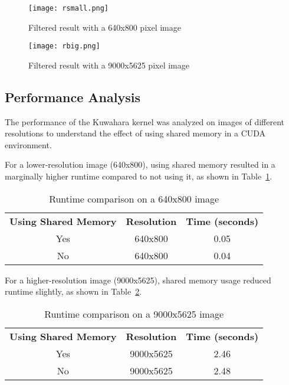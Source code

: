 \documentclass{article}
\begin{document}
    \begin{figure}
        \centering
        \texttt{[image: rsmall.png]}
        \caption{Filtered result with a 640x800 pixel image}
        \label{fig:sample_result_small}
    \end{figure}

    \begin{figure}
        \centering
        \texttt{[image: rbig.png]}
        \caption{Filtered result with a 9000x5625 pixel image}
        \label{fig:sample_result_big}
    \end{figure}

    \subsection{Performance Analysis}
    The performance of the Kuwahara kernel was analyzed on images of different resolutions to understand the effect of using shared memory in a CUDA environment.

    For a lower-resolution image (640x800), using shared memory resulted in a marginally higher runtime compared to not using it, as shown in Table~\ref{tab:result_shared_memory_small}.

    \begin{table}[H]
        \centering
        \begin{tabular}{ccc}
           \textbf{Using Shared Memory} & \textbf{Resolution} & \textbf{Time (seconds)} \\
           Yes & 640x800 & 0.05 \\
           No  & 640x800 & 0.04 \\
        \end{tabular}
        \caption{Runtime comparison on a 640x800 image}
        \label{tab:result_shared_memory_small}
    \end{table}

    For a higher-resolution image (9000x5625), shared memory usage reduced runtime slightly, as shown in Table~\ref{tab:result_shared_memory_big}.

    \begin{table}[H]
        \centering
        \begin{tabular}{ccc}
           \textbf{Using Shared Memory} & \textbf{Resolution} & \textbf{Time (seconds)} \\
           Yes & 9000x5625 & 2.46 \\
           No  & 9000x5625 & 2.48 \\
        \end{tabular}
        \caption{Runtime comparison on a 9000x5625 image}
        \label{tab:result_shared_memory_big}
    \end{table}
\end{document}

